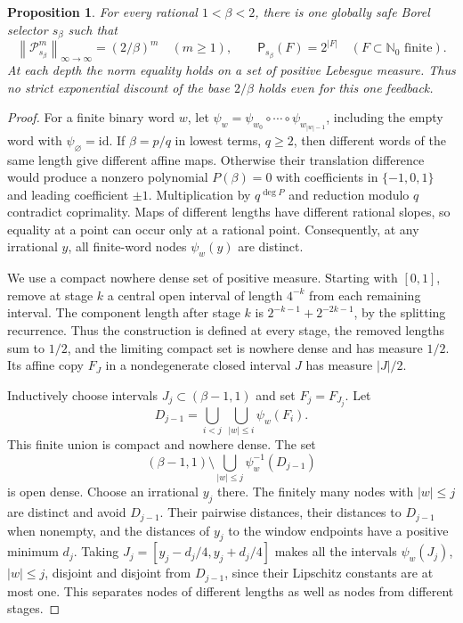\documentclass[11pt,reqno]{amsart}
\numberwithin{equation}{section}
\newtheorem{proposition}[theorem]{Proposition}
\theoremstyle{definition}
\newcommand{\Nzero}{\mathbb N_0}
\newcommand{\Patt}{\mathsf P}
\newcommand{\opnorm}[1]{\left\|#1\right\|_{\infty\to\infty}}
\begin{document}
\begin{proposition}\label{prop:full-depth-saturation}
For every rational $1<\beta<2$, there is one globally safe
Borel selector $s_\beta$ such that
\[
 \opnorm{\mathcal P_{s_\beta}^m}=(2/\beta)^m
 \quad(m\ge1),\qquad
 \Patt_{s_\beta}(F)=2^{|F|}
 \quad(F\subset\Nzero\text{ finite}).
\]
At each depth the norm equality holds on a set of positive
Lebesgue measure. Thus no strict exponential discount of the
base $2/\beta$ holds even for this one feedback.
\end{proposition}
\begin{proof}
For a finite binary word $w$, let
$\psi_w=\psi_{w_0}\circ\cdots\circ\psi_{w_{|w|-1}}$,
including the empty word with $\psi_\varnothing=\mathrm{id}$.
If $\beta=p/q$ in lowest terms, $q\ge2$, then different words
of the same length give different affine maps. Otherwise their
translation difference would produce a nonzero polynomial
$P(\beta)=0$ with coefficients in $\{-1,0,1\}$ and leading
coefficient $\pm1$. Multiplication by $q^{\deg P}$ and reduction
modulo $q$ contradict coprimality. Maps of different lengths
have different rational slopes, so equality at a point can occur
only at a rational point. Consequently, at any irrational $y$,
all finite-word nodes $\psi_w(y)$ are distinct.

We use a compact nowhere dense set of positive measure. Starting
with $[0,1]$, remove at stage $k$ a central open interval of
length $4^{-k}$ from each remaining interval. The component
length after stage $k$ is
$2^{-k-1}+2^{-2k-1}$, by the splitting recurrence.
Thus the construction is defined at every stage, the removed
lengths sum to $1/2$, and the limiting compact set is nowhere
dense and has measure $1/2$. Its affine copy $F_J$ in a
nondegenerate closed interval $J$ has measure $|J|/2$.

Inductively choose intervals $J_j\subset(\beta-1,1)$ and set
$F_j=F_{J_j}$. Let
\[
 D_{j-1}=\bigcup_{i<j}\ \bigcup_{|w|\le i}\psi_w(F_i).
\]
This finite union is compact and nowhere dense.
The set
\[
 (\beta-1,1)\setminus
       \bigcup_{|w|\le j}\psi_w^{-1}(D_{j-1})
\]
is open dense. Choose an irrational $y_j$ there. The finitely
many nodes with $|w|\le j$ are distinct and avoid $D_{j-1}$.
Their pairwise distances, their distances to $D_{j-1}$ when
nonempty, and the distances of $y_j$ to the window endpoints
have a positive minimum $d_j$. Taking
$J_j=[y_j-d_j/4,y_j+d_j/4]$ makes all the intervals
$\psi_w(J_j)$, $|w|\le j$, disjoint and disjoint from
$D_{j-1}$, since their Lipschitz constants are at most one.
This separates nodes of different lengths as well as nodes
from different stages.


\end{proof}
\end{document}
